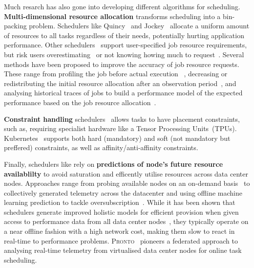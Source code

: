 Much resarch has also gone into developing different algorithms for
scheduling.\\
\textbf{Multi-dimensional resource allocation} transforms scheduling into a
bin-packing problem. Schedulers like Quincy~\cite{126} and Jockey~\cite{136}
allocate a uniform amount of resources to all tasks regardless of their needs,
potentially hurting application performance. Other schedulers~\cite{56, 138,
134,149} support user-specified job resource requirements, but risk users
overestimating~\cite{123} or not knowing howing much to request~\cite{4}.
Several methods have been proposed to improve the accuracy of job resource
requests. These range from profiling the job before actual execution~\cite{138}
, decreasing or redistributing the initial resource allocation after an
observation period~\cite{56,140}, and analysing historical traces of jobs to
build a performance model of the expected performance based on the job resource
allocation~\cite{142, 143, 144}.

\textbf{Constraint handling} schedulers~\cite{} allows tasks to have placement
constraints, such as, requiring specialist hardware like a Tensor Processing
Units~\cite{146}(TPUs). Kubernetes~\cite{} supports both hard (mandatory) and
soft (not mandatory but preffered) constraints, as well as
affinity/anti-affinity constraints.


Finally, schedulers like \cite{Boutin-et-al.,-2014;-Karanasos-et-al.,-2015;-Verma-et-al.,-2015;-Gog-et-al.,-2016;-Mao-et-al.,-2019;-Ousterhout-et-al.,-2013b}
rely on \textbf{predictions of node's future resource
availablilty} to avoid saturation and efficently utilise resources across data
center nodes. Approaches range from probing available nodes on an on-demand
basis~\cite{Ousterhout-et-al.,-2013b;-Verma-et-al.,-2015} to collectively
generated telemetry across the datacenter and using offline machine learning
prediction to tackle oversubscription~\cite{Cortez-et-al.,-2017}. While it has
been shown that schedulers generate improved holistic models for efficient
provision when given access to performance data from all data center
nodes~\cite{Verma-et-al.,-2015;-Gog-et-al.,-2016;-Boutin-et-al.,-2014;-Mao-et-al.,-2019;-Cortez-et-al.,-2017}, they typically operate on a near offline
fashion with a high network cost, making them slow to react in real-time to
performance problems. \textsc{Pronto}~\cite{grammenos_pronto_2021} pioneers
a federated approach to analysing real-time telemetry from virtualised data
center nodes for online task scheduling.

